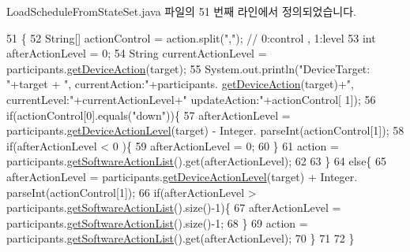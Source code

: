 Load\+Schedule\+From\+State\+Set.\+java 파일의 51 번째 라인에서 정의되었습니다.


\begin{DoxyCode}
51                                 \{
52         String[] actionControl = action.split(\textcolor{stringliteral}{","}); \textcolor{comment}{// 0:control , 1:level}
53         \textcolor{keywordtype}{int} afterActionLevel = 0;
54         String currentActionLevel = participants.\mbox{\hyperlink{classcom_1_1github_1_1aites_1_1framework_1_1orchestration_1_1_participants_aad2cb3cd7db30459a1ef894f2c9b333f}{getDeviceAction}}(target);
55         System.out.println(\textcolor{stringliteral}{"DeviceTarget: "}+target + \textcolor{stringliteral}{", currentAction:"}+participants.
      \mbox{\hyperlink{classcom_1_1github_1_1aites_1_1framework_1_1orchestration_1_1_participants_aad2cb3cd7db30459a1ef894f2c9b333f}{getDeviceAction}}(target)+\textcolor{stringliteral}{", currentLevel:"}+currentActionLevel+\textcolor{stringliteral}{" updateAction:"}+actionControl[
      1]);
56         \textcolor{keywordflow}{if}(actionControl[0].equals(\textcolor{stringliteral}{"down"}))\{
57             afterActionLevel = participants.\mbox{\hyperlink{classcom_1_1github_1_1aites_1_1framework_1_1orchestration_1_1_participants_a513cf30ee884a0ccb53e2edc613a622e}{getDeviceActionLevel}}(target) - Integer.
      parseInt(actionControl[1]);
58             \textcolor{keywordflow}{if}(afterActionLevel < 0 )\{
59                 afterActionLevel = 0;
60             \}
61             action = participants.\mbox{\hyperlink{classcom_1_1github_1_1aites_1_1framework_1_1orchestration_1_1_participants_ad8cff5b48970cc4ca491545e09a94047}{getSoftwareActionList}}().get(afterActionLevel);
62                                             
63         \}
64         \textcolor{keywordflow}{else}\{
65              afterActionLevel = participants.\mbox{\hyperlink{classcom_1_1github_1_1aites_1_1framework_1_1orchestration_1_1_participants_a513cf30ee884a0ccb53e2edc613a622e}{getDeviceActionLevel}}(target) + Integer.
      parseInt(actionControl[1]);
66              \textcolor{keywordflow}{if}(afterActionLevel > participants.\mbox{\hyperlink{classcom_1_1github_1_1aites_1_1framework_1_1orchestration_1_1_participants_ad8cff5b48970cc4ca491545e09a94047}{getSoftwareActionList}}().size()-1)\{
67                  afterActionLevel = participants.\mbox{\hyperlink{classcom_1_1github_1_1aites_1_1framework_1_1orchestration_1_1_participants_ad8cff5b48970cc4ca491545e09a94047}{getSoftwareActionList}}().size()-1;
68              \}
69              action = participants.\mbox{\hyperlink{classcom_1_1github_1_1aites_1_1framework_1_1orchestration_1_1_participants_ad8cff5b48970cc4ca491545e09a94047}{getSoftwareActionList}}().get(afterActionLevel);
70         \}
71         
72     \}
\end{DoxyCode}
